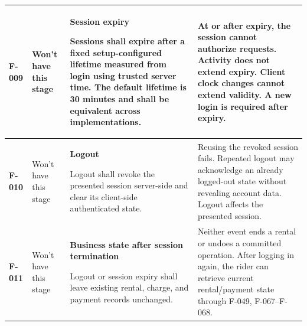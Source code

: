 \documentclass[10pt,a4paper,landscape]{article}
\newcommand{\reqtitle}[1]{{\fontsize{11}{13}\selectfont\bfseries #1}\par\nobreak\vspace{2pt}\noindent}
\begin{document}
\begin{longtable}{|C{27mm}|C{25mm}|L{79mm}|L{111mm}|}
\textbf{F-009} & Won't have this stage & \reqtitle{Session expiry}Sessions shall expire after a fixed setup-configured lifetime measured from login using trusted server time. The default lifetime is 30 minutes and shall be equivalent across implementations. & At or after expiry, the session cannot authorize requests. Activity does not extend expiry. Client clock changes cannot extend validity. A new login is required after expiry. \\\hline

\textbf{F-010} & Won't have this stage & \reqtitle{Logout}Logout shall revoke the presented session server-side and clear its client-side authenticated state. & Reusing the revoked session fails. Repeated logout may acknowledge an already logged-out state without revealing account data. Logout affects the presented session. \\\hline

\textbf{F-011} & Won't have this stage & \reqtitle{Business state after session termination}Logout or session expiry shall leave existing rental, charge, and payment records unchanged. & Neither event ends a rental or undoes a committed operation. After logging in again, the rider can retrieve current rental/payment state through F-049, F-067–F-068. \\\hline
\end{longtable}
\endgroup

\end{document}
